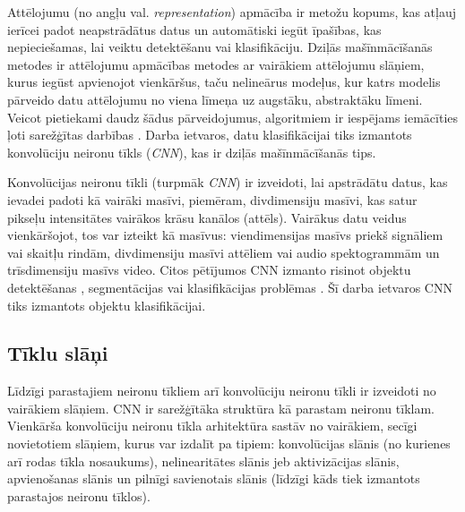 Attēlojumu (no angļu val. \textit{representation}) apmācība ir metožu kopums, kas atļauj ierīcei padot neapstrādātus datus un automātiski iegūt īpašības, kas nepieciešamas, lai veiktu detektēšanu vai klasifikāciju. Dziļās mašīnmācīšanās metodes ir attēlojumu apmācības metodes ar vairākiem attēlojumu slāņiem, kurus iegūst apvienojot vienkāršus, taču nelineārus modeļus, kur katrs modelis pārveido datu attēlojumu no viena līmeņa uz augstāku, abstraktāku līmeni. Veicot pietiekami daudz šādus pārveidojumus, algoritmiem ir iespējams iemācīties ļoti sarežģītas darbības \cite{deepnet}. Darba ietvaros, datu klasifikācijai tiks izmantots konvolūciju neironu tīkls (\textit{CNN}), kas ir dziļās mašīnmācīšanās tips.

Konvolūcijas neironu tīkli (turpmāk \textit{CNN}) ir izveidoti, lai apstrādātu datus, kas ievadei padoti kā vairāki masīvi, piemēram, divdimensiju masīvi, kas satur pikseļu intensitātes vairākos krāsu kanālos (attēls). Vairākus datu veidus vienkāršojot, tos var izteikt kā masīvus: viendimensijas masīvs priekš signāliem vai skaitļu rindām, divdimensiju masīvi attēliem vai audio spektogrammām un trīsdimensiju masīvs video. Citos pētījumos CNN izmanto risinot objektu detektēšanas \cite{li2015convolutional}\cite{matsugu2003subject}, segmentācijas \cite{long2015fully} vai klasifikācijas problēmas \cite{classif}\cite{krizhevsky2012imagenet}\cite{jia2014caffe}. Šī darba ietvaros CNN tiks izmantots objektu klasifikācijai.

\subsection{Tīklu slāņi}
Līdzīgi parastajiem neironu tīkliem arī konvolūciju neironu tīkli ir izveidoti no vairākiem slāņiem. CNN ir sarežģītāka struktūra kā parastam neironu tīklam. Vienkārša konvolūciju neironu tīkla arhitektūra sastāv no vairākiem, secīgi novietotiem slāņiem, kurus var izdalīt pa tipiem: konvolūcijas slānis (no kurienes arī rodas tīkla nosaukums), nelinearitātes slānis jeb aktivizācijas slānis, apvienošanas slānis un pilnīgi savienotais slānis (līdzīgi kāds tiek izmantots parastajos neironu tīklos). 
